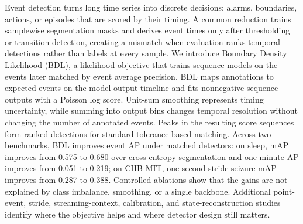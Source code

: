 Event detection turns long time series into discrete decisions: alarms, boundaries, actions, or episodes that are scored by their timing.
A common reduction trains samplewise segmentation masks and derives event times only after thresholding or transition detection, creating a mismatch when evaluation ranks temporal detections rather than labels at every sample.
We introduce Boundary Density Likelihood (BDL), a likelihood objective that trains sequence models on the events later matched by event average precision.
BDL maps annotations to expected events on the model output timeline and fits nonnegative sequence outputs with a Poisson log score.
Unit-sum smoothing represents timing uncertainty, while summing into output bins changes temporal resolution without changing the number of annotated events.
Peaks in the resulting score sequences form ranked detections for standard tolerance-based matching.
Across two benchmarks, BDL improves event AP under matched detectors: on sleep, mAP improves from 0.575 to 0.680 over cross-entropy segmentation and one-minute AP improves from 0.051 to 0.219; on CHB-MIT, one-second-stride seizure mAP improves from 0.287 to 0.388.
Controlled ablations show that the gains are not explained by class imbalance, smoothing, or a single backbone.
Additional point-event, stride, streaming-context, calibration, and state-reconstruction studies identify where the objective helps and where detector design still matters.
